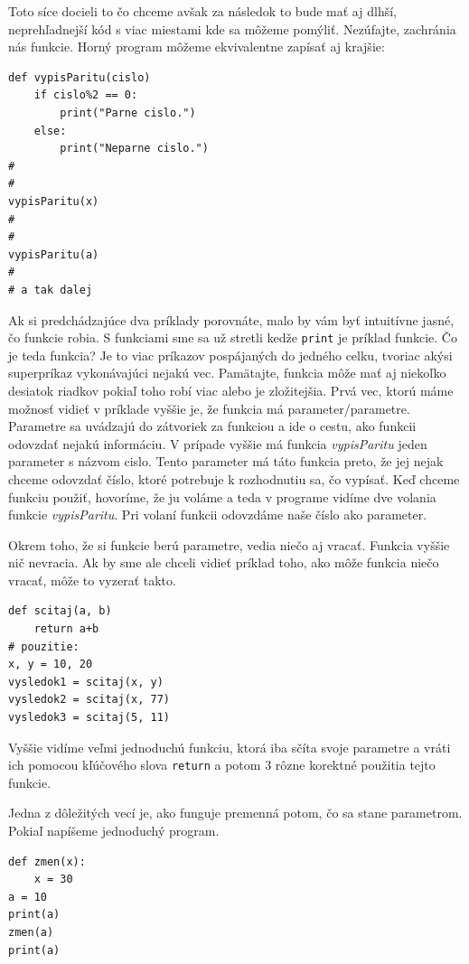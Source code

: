 \documentclass{article}
\begin{document}
Toto síce docieli to čo chceme avšak za následok to bude mať aj dlhší, neprehľadnejší kód s viac miestami kde sa môžeme pomýliť. Nezúfajte, zachránia nás funkcie. Horný program môžeme ekvivalentne zapísať aj krajšie:

\begin{lstlisting}
def vypisParitu(cislo)
    if cislo%2 == 0:
        print("Parne cislo.")
    else:
        print("Neparne cislo.")
#   
#
vypisParitu(x)
#
#
vypisParitu(a)
#
# a tak dalej
\end{lstlisting}

Ak si predchádzajúce dva príklady porovnáte, malo by vám byť intuitívne jasné, čo funkcie robia. S funkciami sme sa už stretli kedže \texttt{print} je príklad funkcie. Čo je teda funkcia? Je to viac príkazov pospájaných do jedného celku, tvoriac akýsi superpríkaz vykonávajúci nejakú vec. Pamätajte, funkcia môže mať aj niekoľko desiatok riadkov pokiaľ toho robí viac alebo je zložitejšia. Prvá vec, ktorú máme možnosť vidieť v príklade vyššie je, že funkcia má parameter/parametre. Parametre sa uvádzajú do zátvoriek za funkciou a ide o cestu, ako funkcii odovzdať nejakú informáciu. V prípade vyššie má funkcia \textit{vypisParitu} jeden parameter s názvom cislo. Tento parameter má táto funkcia preto, že jej nejak chceme odovzdať číslo, ktoré potrebuje k rozhodnutiu sa, čo vypísať. Keď chceme funkciu použiť, hovoríme, že ju voláme a teda v programe vidíme dve volania funkcie \textit{vypisParitu}. Pri volaní funkcii odovzdáme naše číslo ako parameter.

Okrem toho, že si funkcie berú parametre, vedia niečo aj vracať. Funkcia vyššie nič nevracia. Ak by sme ale chceli vidieť príklad toho, ako môže funkcia niečo vracať, môže to vyzerať takto.

\begin{lstlisting}
def scitaj(a, b)
    return a+b
# pouzitie:
x, y = 10, 20
vysledok1 = scitaj(x, y)
vysledok2 = scitaj(x, 77)
vysledok3 = scitaj(5, 11)
\end{lstlisting}

Vyššie vidíme veľmi jednoduchú funkciu, ktorá iba sčíta svoje parametre a vráti ich pomocou kľúčového slova \texttt{return} a potom 3 rôzne korektné použitia tejto funkcie.

Jedna z dôležitých vecí je, ako funguje premenná potom, čo sa stane parametrom. Pokiaľ napíšeme jednoduchý program.

\begin{lstlisting}
def zmen(x):
    x = 30
a = 10
print(a)
zmen(a)
print(a)
\end{lstlisting}
\end{document}
